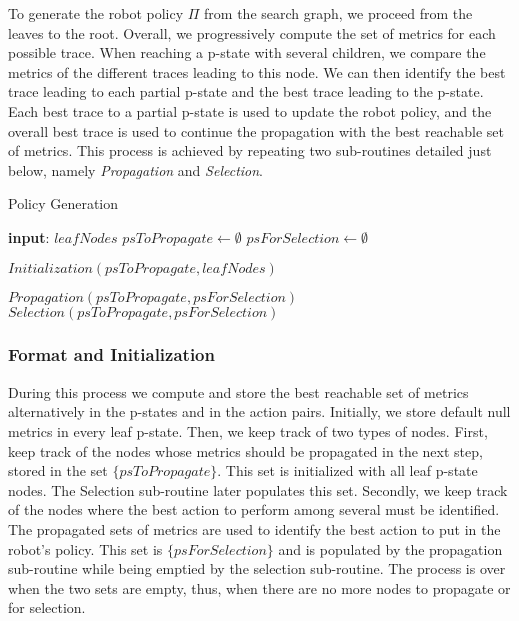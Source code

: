 To generate the robot policy $\Pi$ from the search graph, we proceed from the leaves to the root. 
Overall, we progressively compute the set of metrics for each possible trace. When reaching a p-state with several children, we compare the metrics of the different traces leading to this node. We can then identify the best trace leading to each partial p-state and the best trace leading to the p-state. Each best trace to a partial p-state is used to update the robot policy, and the overall best trace is used to continue the propagation with the best reachable set of metrics.
This process is achieved by repeating two sub-routines detailed just below, namely \textit{Propagation} and \textit{Selection}. 

\begin{algorithm}
\caption{Policy Generation}\label{alg:policy_generation}
\begin{algorithmic}[1]

\State \textbf{input}: $leafNodes$ 
\State $psToPropagate \gets \emptyset$
\State $psForSelection \gets \emptyset$

\State $Initialization(psToPropagate, leafNodes)$

    \State $Propagation(psToPropagate, psForSelection)$
    \State $Selection(psToPropagate, psForSelection)$
\EndWhile

\end{algorithmic}
\end{algorithm}

    \subsubsection{Format and Initialization}

During this process we compute and store the best reachable set of metrics alternatively in the p-states and in the action pairs. Initially, we store default null metrics in every leaf p-state. Then, we keep track of two types of nodes. First, keep track of the nodes whose metrics should be propagated in the next step, stored in the set $\{psToPropagate\}$. This set is initialized with all leaf p-state nodes. The Selection sub-routine later populates this set. Secondly, we keep track of the nodes where the best action to perform among several must be identified. The propagated sets of metrics are used to identify the best action to put in the robot's policy. This set is $\{psForSelection\}$ and is populated by the propagation sub-routine while being emptied by the selection sub-routine. The process is over when the two sets are empty, thus, when there are no more nodes to propagate or for selection.

